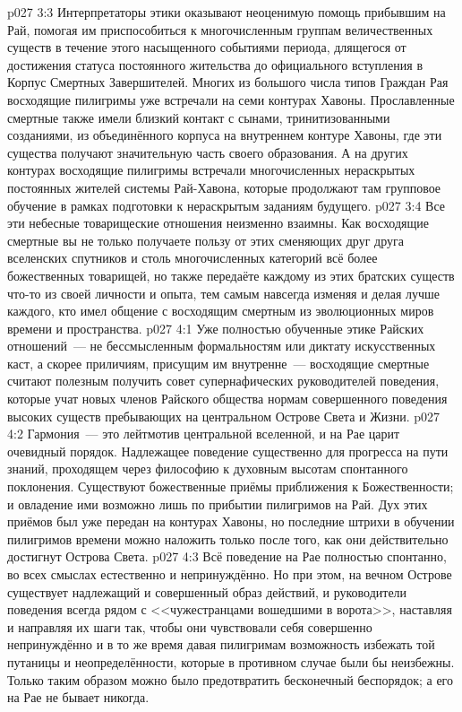 \vs p027 3:3 Интерпретаторы этики оказывают неоценимую помощь прибывшим на Рай, помогая им приспособиться к многочисленным группам величественных существ в течение этого насыщенного событиями периода, длящегося от достижения статуса постоянного жительства до официального вступления в Корпус Смертных Завершителей. Многих из большого числа типов Граждан Рая восходящие пилигримы уже встречали на семи контурах Хавоны. Прославленные смертные также имели близкий контакт с сынами, тринитизованными созданиями, из объединённого корпуса на внутреннем контуре Хавоны, где эти существа получают значительную часть своего образования. А на других контурах восходящие пилигримы встречали многочисленных нераскрытых постоянных жителей системы Рай\hyp{}Хавона, которые продолжают там групповое обучение в рамках подготовки к нераскрытым заданиям будущего.
\vs p027 3:4 Все эти небесные товарищеские отношения неизменно взаимны. Как восходящие смертные вы не только получаете пользу от этих сменяющих друг друга вселенских спутников и столь многочисленных категорий всё более божественных товарищей, но также передаёте каждому из этих братских существ что\hyp{}то из своей личности и опыта, тем самым навсегда изменяя и делая лучше каждого, кто имел общение с восходящим смертным из эволюционных миров времени и пространства.
\vs p027 4:1 Уже полностью обученные этике Райских отношений~--- не бессмысленным формальностям или диктату искусственных каст, а скорее приличиям, присущим им внутренне~--- восходящие смертные считают полезным получить совет супернафических руководителей поведения, которые учат новых членов Райского общества нормам совершенного поведения высоких существ пребывающих на центральном Острове Света и Жизни.
\vs p027 4:2 Гармония~--- это лейтмотив центральной вселенной, и на Рае царит очевидный порядок. Надлежащее поведение существенно для прогресса на пути знаний, проходящем через философию к духовным высотам спонтанного поклонения. Существуют божественные приёмы приближения к Божественности; и овладение ими возможно лишь по прибытии пилигримов на Рай. Дух этих приёмов был уже передан на контурах Хавоны, но последние штрихи в обучении пилигримов времени можно наложить только после того, как они действительно достигнут Острова Света.
\vs p027 4:3 Всё поведение на Рае полностью спонтанно, во всех смыслах естественно и непринуждённо. Но при этом, на вечном Острове существует надлежащий и совершенный образ действий, и руководители поведения всегда рядом с <<чужестранцами вошедшими в ворота>>, наставляя и направляя их шаги так, чтобы они чувствовали себя совершенно непринуждённо и в то же время давая пилигримам возможность избежать той путаницы и неопределённости, которые в противном случае были бы неизбежны. Только таким образом можно было предотвратить бесконечный беспорядок; а его на Рае не бывает никогда.

